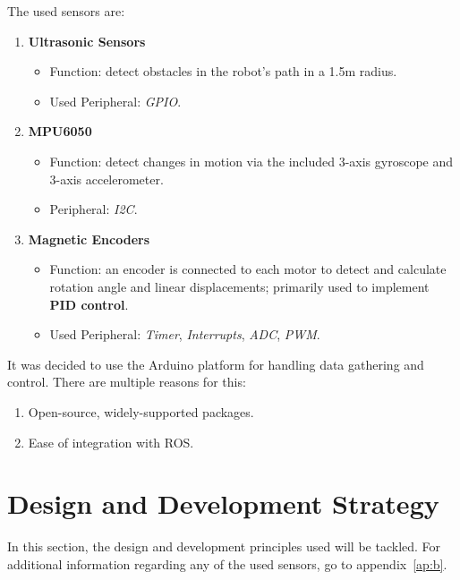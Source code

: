 The used sensors are:
\vspace{-1mm}
\begin{enumerate}
    \item \textbf{Ultrasonic Sensors}
    \vspace{-1.5mm}
        \begin{itemize}
            \item Function: detect obstacles in the robot's path in a 1.5m radius.
            \vspace{-1mm}
            \item Used Peripheral: \textit{GPIO}.
        \end{itemize}
    \item \textbf{MPU6050}
    \vspace{-1.5mm}
        \begin{itemize}
            \item Function: detect changes in motion via the included 3-axis gyroscope and 3-axis accelerometer. 
           \vspace{-1mm}
            \item Peripheral: \textit{I2C}.
        \end{itemize}
    \item \textbf{Magnetic Encoders} 
    \vspace{-1.5mm}
        \begin{itemize}
            \item Function: an encoder is connected to each motor to detect and calculate rotation angle and linear displacements; primarily used to implement \textbf{PID control}.
            \vspace{-1mm}
            \item Used Peripheral: \textit{Timer}, \textit{Interrupts}, \textit{ADC}, \textit{PWM}.
        \end{itemize}
\end{enumerate}

It was decided to use the Arduino platform for handling data gathering and control. There are multiple reasons for this:
\begin{enumerate}
    \item Open-source, widely-supported packages.
    \item Ease of integration with ROS.
\end{enumerate}

\newpage

\section{Design and Development Strategy}
In this section, the design and development principles used will be tackled. For additional information regarding any of the used sensors, go to appendix~\ref{ap:b}.
